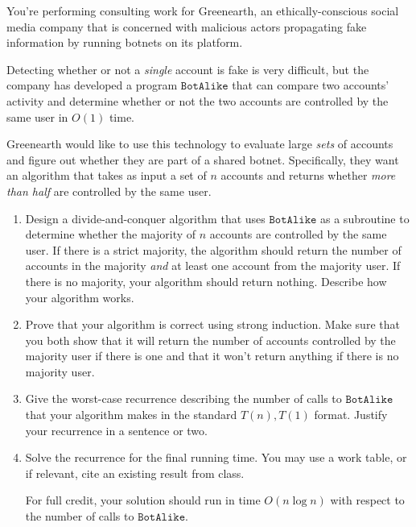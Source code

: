 \documentclass[12 pt, letterpaper]{hmcpset}
\begin{document}
\pagebreak

\begin{problem}
	You're performing consulting work for Greenearth, an ethically-conscious social media company that is concerned with malicious actors propagating fake information by running botnets on its platform.

	Detecting whether or not a \emph{single} account is fake is very difficult, but the company has developed a program $\mathtt{BotAlike}$ that can compare two accounts' activity and determine whether or not the two accounts are controlled by the same user in $O(1)$ time. 

	Greenearth would like to use this technology to evaluate large \emph{sets} of accounts and figure out whether they are part of a shared botnet. Specifically, they want an algorithm that takes as input a set of $n$ accounts and returns whether \emph{more than half} are controlled by the same user.

	\begin{enumerate}
		\item Design a divide-and-conquer algorithm that uses $\mathtt{BotAlike}$ as a subroutine to determine whether the majority of $n$ accounts are controlled by the same user. If there is a strict majority, the algorithm should return the number of accounts in the majority \emph{and} at least one account from the majority user. If there is no majority, your algorithm should return nothing. Describe how your algorithm works.

		\item Prove that your algorithm is correct using strong induction. Make sure that you both show that it will return the number of accounts controlled by the majority user if there is one and that it won't return anything if there is no majority user.

		\item Give the worst-case recurrence describing the number of calls to $\mathtt{BotAlike}$ that your algorithm makes in the standard $T(n), T(1)$ format. Justify your recurrence in a sentence or two.

		\item Solve the recurrence for the final running time. You may use a work table, or if relevant, cite an existing result from class.

		For full credit, your solution should run in time $O(n \log n)$ with respect to the number of calls to $\mathtt{BotAlike}$.
	\end{enumerate}
\end{problem}
\end{document}
